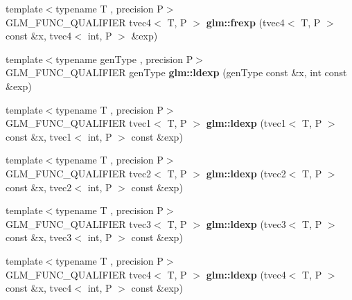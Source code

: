 \begin{DoxyCompactItemize}
\item 
\hypertarget{namespaceglm_a1e479592e7aa1e3e3193de5fdce9a2c1}{{\footnotesize template$<$typename T , precision P$>$ }\\G\-L\-M\-\_\-\-F\-U\-N\-C\-\_\-\-Q\-U\-A\-L\-I\-F\-I\-E\-R tvec4$<$ T, P $>$ {\bfseries glm\-::frexp} (tvec4$<$ T, P $>$ const \&x, tvec4$<$ int, P $>$ \&exp)}\label{namespaceglm_a1e479592e7aa1e3e3193de5fdce9a2c1}

\item 
\hypertarget{namespaceglm_a5c453639629fa99ccaa3438e455866b3}{{\footnotesize template$<$typename gen\-Type , precision P$>$ }\\G\-L\-M\-\_\-\-F\-U\-N\-C\-\_\-\-Q\-U\-A\-L\-I\-F\-I\-E\-R gen\-Type {\bfseries glm\-::ldexp} (gen\-Type const \&x, int const \&exp)}\label{namespaceglm_a5c453639629fa99ccaa3438e455866b3}

\item 
\hypertarget{namespaceglm_aede23b4113d6d562c9290312af546ffc}{{\footnotesize template$<$typename T , precision P$>$ }\\G\-L\-M\-\_\-\-F\-U\-N\-C\-\_\-\-Q\-U\-A\-L\-I\-F\-I\-E\-R tvec1$<$ T, P $>$ {\bfseries glm\-::ldexp} (tvec1$<$ T, P $>$ const \&x, tvec1$<$ int, P $>$ const \&exp)}\label{namespaceglm_aede23b4113d6d562c9290312af546ffc}

\item 
\hypertarget{namespaceglm_aaa95b8049903d4a4d7af619c0368a624}{{\footnotesize template$<$typename T , precision P$>$ }\\G\-L\-M\-\_\-\-F\-U\-N\-C\-\_\-\-Q\-U\-A\-L\-I\-F\-I\-E\-R tvec2$<$ T, P $>$ {\bfseries glm\-::ldexp} (tvec2$<$ T, P $>$ const \&x, tvec2$<$ int, P $>$ const \&exp)}\label{namespaceglm_aaa95b8049903d4a4d7af619c0368a624}

\item 
\hypertarget{namespaceglm_a991d1c012aefb805ddd6bb97c001553c}{{\footnotesize template$<$typename T , precision P$>$ }\\G\-L\-M\-\_\-\-F\-U\-N\-C\-\_\-\-Q\-U\-A\-L\-I\-F\-I\-E\-R tvec3$<$ T, P $>$ {\bfseries glm\-::ldexp} (tvec3$<$ T, P $>$ const \&x, tvec3$<$ int, P $>$ const \&exp)}\label{namespaceglm_a991d1c012aefb805ddd6bb97c001553c}

\item 
\hypertarget{namespaceglm_a50fbbebff2e110062eafca8839cb5d37}{{\footnotesize template$<$typename T , precision P$>$ }\\G\-L\-M\-\_\-\-F\-U\-N\-C\-\_\-\-Q\-U\-A\-L\-I\-F\-I\-E\-R tvec4$<$ T, P $>$ {\bfseries glm\-::ldexp} (tvec4$<$ T, P $>$ const \&x, tvec4$<$ int, P $>$ const \&exp)}\label{namespaceglm_a50fbbebff2e110062eafca8839cb5d37}

\end{DoxyCompactItemize}


